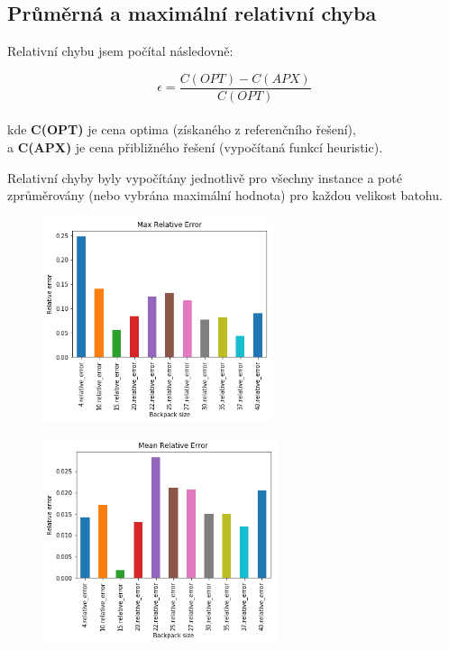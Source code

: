 \documentclass[a4paper,10pt,twocolumn]{article}
\begin{document}
\subsection{Průměrná a maximální relativní chyba}

Relativní chybu jsem počítal následovně:

$$  \epsilon = \frac{C(OPT)-C(APX)}{C(OPT)} $$ \\ kde \textbf{C(OPT)} je cena optima (získaného z referenčního řešení), \\
a \textbf{C(APX)} je cena přibližného řešení (vypočítaná funkcí heuristic).

Relativní chyby byly vypočítány jednotlivě pro všechny instance a poté zprůměrovány (nebo vybrána maximální hodnota) pro každou velikost batohu.
\begin{figure}[H]
  \begin{center}
    \includegraphics[height=6cm]{graphs/max_errors.png}
  \end{center}
\end{figure}

\begin{figure}[H]
  \begin{center}
    \includegraphics[height=6cm]{graphs/mean_errors.png}
  \end{center}
\end{figure}
\end{document}
